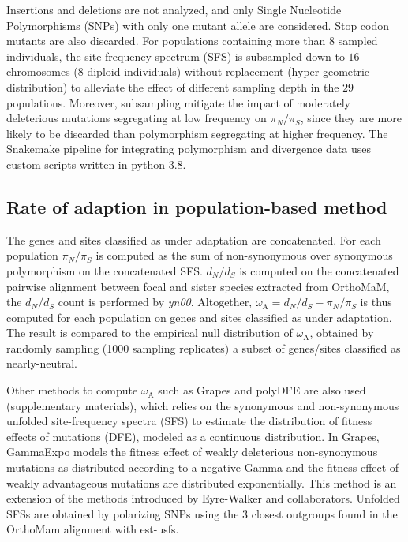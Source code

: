 \documentclass{article}
\newcommand{\dn}{d_N}
\newcommand{\ds}{d_S}
\newcommand{\dnds}{\dn / \ds}
\newcommand{\pn}{\pi_N}
\newcommand{\ps}{\pi_S}
\newcommand{\pnps}{\pn / \ps}
\begin{document}
    Insertions and deletions are not analyzed, and only Single Nucleotide Polymorphisms (SNPs) with only one mutant allele are considered.
    Stop codon mutants are also discarded.
    For populations containing more than $8$ sampled individuals, the site-frequency spectrum (SFS) is subsampled down to $16$ chromosomes ($8$ diploid individuals) without replacement (hyper-geometric distribution) to alleviate the effect of different sampling depth in the $29$ populations.
    Moreover, subsampling mitigate the impact of moderately deleterious mutations segregating at low frequency on $\pnps$, since they are more likely to be discarded than polymorphism segregating at higher frequency.
    The Snakemake pipeline for integrating polymorphism and divergence data uses custom scripts written in python 3.8.

    \subsection*{Rate of adaption in population-based method}

    The genes and sites classified as under adaptation are concatenated.
    For each population $\pnps$ is computed as the sum of non-synonymous over synonymous polymorphism on the concatenated SFS\@.
    $\dnds$ is computed on the concatenated pairwise alignment between focal and sister species extracted from OrthoMaM, the $\dnds$ count is performed by \textit{yn00}.
    Altogether, $\omega_{\mathrm{A}} = \dnds - \pnps$ is thus computed for each population on genes and sites classified as under adaptation.
    The result is compared to the empirical null distribution of $\omega_{\mathrm{A}}$, obtained by randomly sampling (1000 sampling replicates) a subset of genes/sites classified as nearly-neutral.

    Other methods to compute $\omega_{\mathrm{A}}$ such as Grapes\cite{galtier_adaptive_2016} and polyDFE\cite{tataru_polydfe_2020} are also used (supplementary materials), which relies on the synonymous and non-synonymous unfolded site-frequency spectra (SFS) to estimate the distribution of fitness effects of mutations (DFE), modeled as a continuous distribution.
    In Grapes, GammaExpo models the fitness effect of weakly deleterious non-synonymous mutations as distributed according to a negative Gamma and the fitness effect of weakly advantageous mutations are distributed exponentially.
    This method is an extension of the methods introduced by Eyre-Walker and collaborators\cite{eyre-walker_distribution_2006, eyre-walker_estimating_2009}.
    Unfolded SFSs are obtained by polarizing SNPs using the $3$ closest outgroups found in the OrthoMam alignment with est-usfs\cite{keightley_inferring_2018}.
\end{document}
